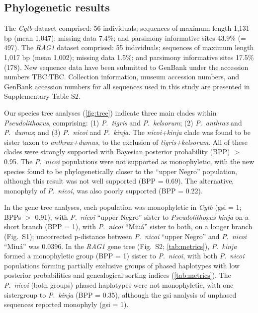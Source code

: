 \documentclass[12pt]{article}
\begin{document}
\subsection*{Phylogenetic results}

The \emph{Cytb} dataset comprised: 56 individuals; sequences of maximum length 1,131 bp (mean 1,047); missing data 7.4\%; and parsimony informative sites 43.9\% (= 497). %
The \emph{RAG1} dataset comprised: 55 individuals; sequences of maximum length 1,017 bp (mean 1,002); missing data 1.5\%; and parsimony informative sites 17.5\% (178). %
New sequence data have been submitted to GenBank under the accession numbers TBC:TBC. %
Collection information, museum accession numbers, and GenBank accession numbers for all sequences used in this study are presented in Supplementary Table S2.%

Our species tree analyses (\autoref{fig:tree}) indicate three main clades within \emph{Pseudolithoxus}, comprising: (1) \emph{P}.\ \emph{tigris} and \emph{P}.\ \emph{kelsorum}; (2) \emph{P}.\ \emph{anthrax} and \emph{P}.\ \emph{dumus}; and (3) \emph{P}.\ \emph{nicoi} and \emph{P}.\ \emph{kinja}. %
The \emph{nicoi+kinja} clade was found to be sister taxon to \emph{anthrax+dumus}, to the exclusion of \emph{tigris+kelsorum}. %
All of these clades were strongly supported with Bayesian posterior probability (BPP) $>$ 0.95. %
The \emph{P}.\ \emph{nicoi} populations were not supported as monophyletic, with the new species found to be phylogenetically closer to the ``upper Negro'' population, although this result was not well supported (BPP = 0.69). %
The alternative, monophyly of \emph{P}.\ \emph{nicoi}, was also poorly supported (BPP = 0.22).%

In the gene tree analyses, each population was monophyletic in \emph{Cytb} (gsi = 1; BPPs $>$ 0.91), with \emph{P}.\ \emph{nicoi} ``upper Negro'' sister to \emph{Pseudolithoxus kinja} on a short branch (BPP = 1), with \emph{P}.\ \emph{nicoi} ``Miuá'' sister to both, on a longer branch (Fig.\ S1); uncorrected p-distance between \emph{P}.\ \emph{nicoi} ``upper Negro'' and \emph{P}.\ \emph{nicoi} ``Miuá'' was 0.0396. %
In the \emph{RAG1} gene tree (Fig.\ S2; \autoref{tab:metrics}), \emph{P}.\ \emph{kinja} formed a monophyletic group (BPP = 1) sister to \emph{P}.\ \emph{nicoi}, with both \emph{P}.\ \emph{nicoi} populations forming partially exclusive groups of phased haplotypes with low posterior probabilities and genealogical sorting indices (\autoref{tab:metrics}). %
The \emph{P}.\ \emph{nicoi} (both groups) phased haplotypes were not monophyletic, with one sistergroup to \emph{P}.\ \emph{kinja} (BPP = 0.35), although the gsi analysis of unphased sequences reported monophyly (gsi = 1).%
\end{document}
